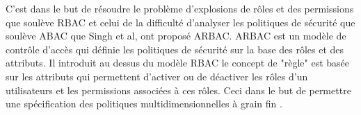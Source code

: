 \label{sectionARBAC}
 
 C'est dans le but de résoudre le problème d'explosions de rôles et des permissions que soulève RBAC et celui de la difficulté d'analyser les politiques de sécurité que soulève ABAC que Singh et al, ont proposé ARBAC. ARBAC est un modèle de contrôle d'accès qui définie les politiques de sécurité sur la base des rôles et des attributs. Il introduit au dessus du modèle RBAC le concept de "règle" est basée sur les attributs qui permettent d'activer ou de déactiver les rôles d'un utilisateurs et les permissions associées à ces rôles. Ceci dans le but de permettre une spécification des politiques multidimensionnelles à grain fin \cite{singh19}.
 
\label{sectionComposantARBAC}


